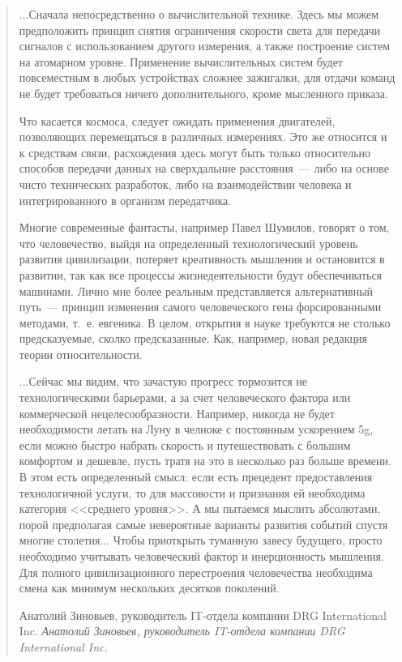 \documentclass{scrbook}
\makeatletter
\newcommand{\flqq}{<<}
\newcommand{\frqq}{>>}
\newcommand{\mdash}{~--- }
\newcommand{\inlineauthor}[1]{\emph{#1}}
\newcommand{\myquotation}[2][\@empty]{
	\begin{quotation}
	#2

	\ifx\@empty#1
	\else
		\nopagebreak	
		\inlineauthor{#1}
	\fi
	\end{quotation}
}
\makeatother
\begin{document}
\myquotation[Анатолий Зиновьев, руководитель IT-отдела компании DRG International Inc.]{...Сначала непосредственно о вычислительной технике. Здесь мы можем предположить принцип снятия ограничения скорости света для передачи сигналов с использованием другого измерения, а также построение систем на атомарном уровне. Применение вычислительных систем будет повсеместным в любых устройствах сложнее зажигалки, для отдачи команд не будет требоваться ничего дополнительного, кроме мысленного приказа.

Что касается космоса, следует ожидать применения двигателей, позволяющих перемещаться в различных измерениях. Это же относится и к средствам связи, расхождения здесь могут быть только относительно способов передачи данных на сверхдальние расстояния{\mdash}либо на основе чисто технических разработок, либо на взаимодействии человека и интегрированного в организм передатчика.

Многие современные фантасты, например Павел Шумилов, говорят о том, что человечество, выйдя на определенный технологический уровень развития цивилизации, потеряет креативность мышления и остановится в развитии, так как все процессы жизнедеятельности будут обеспечиваться машинами. Лично мне более реальным представляется альтернативный путь{\mdash}принцип изменения самого человеческого гена форсированными методами, т.~е. евгеника. В целом, открытия в науке требуются не столько предсказуемые, сколко предсказанные. Как, например, новая редакция теории относительности.

...Сейчас мы видим, что зачастую прогресс тормозится не технологическими барьерами, а за счет человеческого фактора или коммерческой нецелесообразности. Например, никогда не будет необходимости летать на Луну в челноке с постоянным ускорением 5g, если можно быстро набрать скорость и путешествовать с большим комфортом и дешевле, пусть тратя на это в несколько раз больше времени. В этом есть определенный смысл: если есть прецедент предоставления технологичной услуги, то для массовости и признания ей необходима категория {\flqq}среднего уровня{\frqq}. А мы пытаемся мыслить абсолютами, порой предполагая самые невероятные варианты развития событий спустя многие столетия... Чтобы приоткрыть туманную завесу будущего, просто необходимо учитывать человеческий фактор и инерционность мышления. Для полного цивилизационного перестроения человечества необходима смена как минимум нескольких десятков поколений.}
\end{document}
